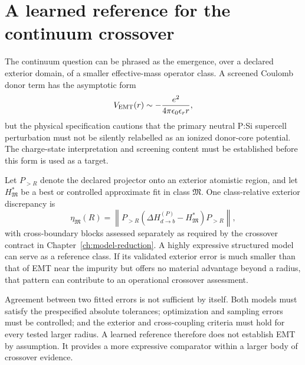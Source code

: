 \section{A learned reference for the continuum crossover}


The continuum question can be phrased as the emergence, over a declared
exterior domain, of a smaller effective-mass operator class. A screened
Coulomb donor term has the asymptotic form
\begin{equation}
  V_{\rm EMT}(r)
  \sim
  -\frac{e^2}{4\pi\epsilon_0\epsilon_r r},
\end{equation}
but the physical specification cautions that the primary neutral P:Si
supercell perturbation must not be silently relabelled as an ionized donor-core
potential. The charge-state interpretation and screening content must be
established before this form is used as a target.


Let $P_{>R}$ denote the declared projector onto an exterior atomistic region,
and let $H_{\mathfrak M}^{\ast}$ be a best or controlled approximate fit in
class $\mathfrak M$. One class-relative exterior discrepancy is
\begin{equation}
  \eta_{\mathfrak M}(R)
  =
  \left\|
    P_{>R}
    \left(\Delta H_{d\to b}^{(P)}-H_{\mathfrak M}^{\ast}\right)
    P_{>R}
  \right\|,
  \label{eq:class-exterior-error}
\end{equation}
with cross-boundary blocks assessed separately as required by the crossover
contract in Chapter~\ref{ch:model-reduction}. A highly expressive structured
model can serve as a reference class. If its validated exterior error is much
smaller than that of EMT near the impurity but offers no material advantage
beyond a radius, that pattern can contribute to an operational crossover
assessment.

Agreement between two fitted errors is not sufficient by itself. Both models
must satisfy the prespecified absolute tolerances; optimization and
sampling errors must be controlled; and the exterior and cross-coupling
criteria must hold for every tested larger radius. A learned reference therefore
does not establish EMT by assumption. It provides a more expressive comparator
within a larger body of crossover evidence.

